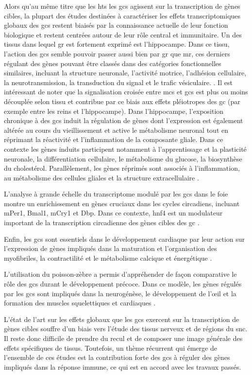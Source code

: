 \documentclass[../main.tex]{subfiles}
\begin{document}
Alors qu'au même titre que les \glspl{ht} les \glspl{gc} agissent sur la transcription de gènes cibles, la plupart des études destinées à caractériser les effets transcriptomiques globaux des \glspl{gc} restent biaisés par la connaissance actuelle de leur fonction biologique et restent centrées autour de leur rôle central et immunitaire.
Un des tissus dans lequel \gls{gr} est fortement exprimé est l'hippocampe.
Dans ce tissu, l'action des \glspl{gc} semble pouvoir passer aussi bien par \gls{gr} que \gls{mr}, ces derniers régulant des gènes pouvant être classés dans des catégories fonctionnelles similaires, incluant la structure neuronale, l'activité motrice, l'adhésion cellulaire, la neurotransmission, la transduction du signal et le trafic vésiculaire. \citep{Datson2001}.
Il est intéressant de noter que la signalisation croisée entre \glspl{mc} et \glspl{gc} est plus ou moins découplée selon tissu et contribue par ce biais aux effets pléiotropes des \gls{gc} (par exemple entre les reins et l'hippocampe).
Dans l'hippocampe, l'exposition chronique à des \glspl{gc} induit la régulation de gènes dont l'expression est également altérée au cours du vieillissement et active le métabolisme neuronal tout en réprimant la réactivité et l'inflammation de la composante gliale.
Dans ce contexte les gènes induits participent notamment à l'apprentissage et la plasticité neuronale, la différentiation cellulaire, le métabolisme du glucose, la biosynthèse du cholestérol.
Parallèlement, les gènes réprimés sont associés à l'inflammation, au métabolisme des cellules gliales et la structure extracellulaire \citep{Chen2013b,Carter2012}.
\par
L'analyse à grande échelle du transcriptome modulé par les \glspl{gc} dans le foie montre un enrichissement en gènes cruciaux dans les cycles circadiens, incluant mPer1, Bmal1, mCry1 et Dbp.
Dans ce contexte, \gls{hnf4} est un modulateur important de la transcription circadienne des gènes cibles des \gls{gc} \citep{Reddy2007}.
\par
Enfin, les \glspl{gc} sont essentiels dans le développement cardiaque par leur action sur l'expression de gènes impliqués dans la maturation et l'organisation des myofibriles, la contractilité et le métabolisme calcique et énergétique \cite{Rog-Zielinska2013}.
\par
L'utilisation du poisson-zèbre a permis d'appréhender de façon comparative le rôle des \glspl{gc} durant le développement précoce.
Dans ce modèle, les gènes régulés par les \glspl{gc} sont impliqués dans la neurogénèse, le développement de l'œil et la formation des muscles squelettiques et cardiaques \citep{Nesan2013}.
\par
L'état de l'art sur les effets globaux que les \glspl{gc} exercent sur la transcription de gènes cibles souffre d'un biais vers l'étude des tissus nerveux et de régions du \gls{snc}.
Il reste donc difficile de prendre du recul et de composer une image générale des effets spécifiques de tissus.
Toutefois, un thème récurrent qui émerge de l'ensemble de ces études est la contribution forte des \glspl{gc} à réguler des gènes impliqués dans la réponse immune, ce qui est en accord avec les travaux passés.

\end{document}
